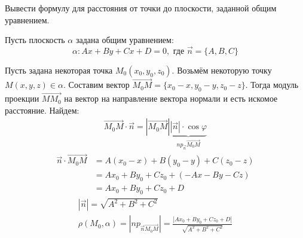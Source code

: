 \begin{question}
  Вывести формулу для расстояния от точки до плоскости, заданной общим уравнением.
\end{question}
\begin{answer}
  Пусть плоскость $\alpha$ задана общим уравнением: \[
    \alpha: Ax + By + Cx + D = 0, \text{ где } \vec{n} = \{A, B, C\} 
\] 

Пусть задана некоторая точка $M_0(x_0, y_0, z_0)$. 
Возьмём некоторую точку $M(x, y, z) \in \alpha$. 
Составим вектор $\overrightarrow{M_0M} = \{x_0 - x, y_0 - y, z_0 - z\}$. 
Тогда модуль проекции $\overrightarrow{MM_0}$ на вектор на направление вектора нормали и есть искомое расстояние. 
Найдем: 
\begin{gather*}
  \overrightarrow{M_0M} \cdot \vec{n} = |\overrightarrow{M_0M}|\underbrace
  {|\vec{n}| \cdot \cos \varphi}_
  {np_{\vec{n}}\overrightarrow{M_0M}}
\end{gather*}
\begin{align*}
  \vec{n} \cdot \overrightarrow{M_0M} &= A(x_0 - x) + B(y_0 - y) + C(z_0 - z) \\
                                 &= Ax_0 + By_0 + Cz_0 + (-Ax - By - Cz) \\
                                 &= Ax_0 + By_0 + Cz_0  + D
\end{align*}
\begin{gather*}
  |\vec{n}| = \sqrt{A^2 + B^2 + C^2} \\
  \boxed{\rho(M_0, \alpha) = |np_{\vec{n}\overrightarrow{M_0M}}| = \frac{|Ax_0 + By_0 + Cz_0 + D| }{\sqrt{A^2 + B^2 + C^2} } }
\end{gather*}   
\end{answer}

